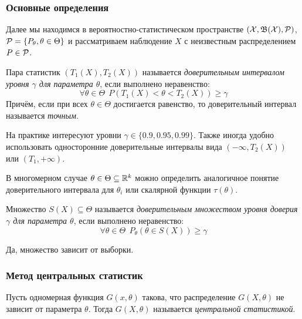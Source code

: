 \subsubsection{Основные определения}

\begin{note}
	Далее мы находимся в вероятностно-статистическом пространстве $(\mathcal{X}, \mathfrak{B}(\mathcal{X}), \mathcal{P})$, $\mathcal{P} = \{P_\theta, \theta \in \Theta\}$ и рассматриваем наблюдение $X$ с неизвестным распределением $P \in \mathcal{P}$.
\end{note}

\begin{definition}
	Пара статистик $(T_1(X), T_2(X))$ называется \textit{доверительным интервалом уровня $\gamma$ для параметра $\theta$}, если выполнено неравенство:
	\[
		\forall \theta \in \Theta\ \ P(T_1(X) < \theta < T_2(X)) \ge \gamma
	\]
	Причём, если при всех $\theta \in \Theta$ достигается равенство, то доверительный интервал называется \textit{точным}.
\end{definition}

\begin{note}
	На практике интересуют уровни $\gamma \in \{0.9, 0.95, 0.99\}$. Также иногда удобно использовать односторонние доверительные интервалы вида $(-\infty, T_2(X))$ или $(T_1, +\infty)$.
\end{note}

\begin{note}
	В многомерном случае $\theta \in \Theta \subseteq \mathbb{R}^k$ можно определить аналогичное понятие доверительного интервала для $\theta_i$ или скалярной функции $\tau(\theta)$.
\end{note}

\begin{definition}
	Множество $S(X) \subseteq \Theta$ называется \textit{доверительным множеством уровня доверия $\gamma$ для параметра $\theta$}, если выполнено неравенство:
	\[
		\forall \theta \in \Theta\ \ P_\theta(\theta \in S(X)) \ge \gamma
	\]
\end{definition}

\begin{anote}
	Да, множество зависит от выборки.
\end{anote}

\subsubsection{Метод центральных статистик}

\begin{definition}
	Пусть одномерная функция $G(x, \theta)$ такова, что распределение $G(X, \theta)$ не зависит от параметра $\theta$. Тогда $G(X, \theta)$ называется \textit{центральной статистикой}.
\end{definition}

